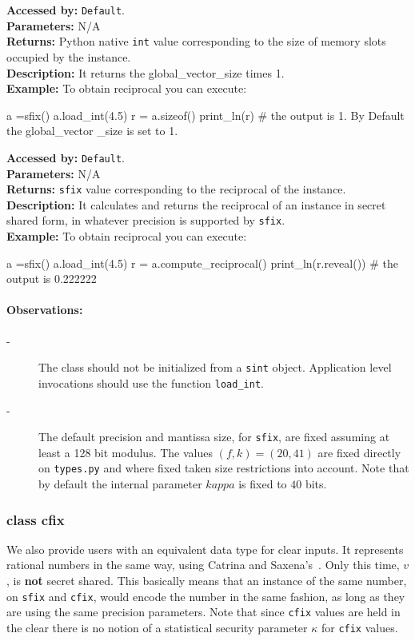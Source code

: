 		
			\textbf{Accessed by:} \verb|Default|.		 \\
			\textbf{Parameters:} N/A \\
			\textbf{Returns:}
				 Python native \verb|int| value corresponding to the size of memory slots occupied by the instance. \\
			\textbf{Description:}
				It returns the global_vector_size times 1. \\
	     	\textbf{Example:}
    		    To obtain reciprocal you can execute:
		     	\begin{mylisting}
				a =sfix()
				a.load_int(4.5)
				r = a.sizeof()
				print_ln(r)  # the output is 1. By Default the global_vector
				_size is set to 1.    	
     			\end{mylisting}	 
			\textbf{Accessed by:} \verb|Default|.		 \\
			\textbf{Parameters:} N/A \\
			\textbf{Returns:} \verb|sfix| value corresponding to the reciprocal of the instance. \\
			\textbf{Description:}
				It calculates and returns the reciprocal of an instance in secret shared form, 
				in whatever precision is supported by \verb|sfix|.\\
	     	\textbf{Example:}
    		    To obtain reciprocal you can execute:
		     	\begin{mylisting}
				a =sfix()
				a.load_int(4.5)
				r = a.compute_reciprocal()
				print_ln(r.reveal())  # the output is 0.222222   	
     			\end{mylisting}	 
	\paragraph{Observations:}
	\begin{description}
	\item[-] The class should not be initialized from a \verb|sint| object. 
    Application level invocations should use the function \verb|load_int|.
    \item[-] The default precision and mantissa size, for \verb|sfix|, are fixed assuming at least a 128 bit modulus. 
    The values $(f,k)=(20,41)$ are fixed directly on \verb|types.py| and where fixed taken size restrictions into account.
    Note that by default the internal parameter $kappa$ is fixed to $40$ bits. 
	\end{description}
	
\subsubsection{class cfix}
We also provide users with an equivalent data type for clear inputs. 
It represents rational numbers in the same way, using Catrina and Saxena's~\cite{CS10}.
Only this time, $v$, is \textbf{not} secret shared.  
This basically means that an instance of the same number, on \verb|sfix| and \verb|cfix|, 
would  encode the number in the same fashion, as long as they are using 
the same precision parameters.
Note that since \verb|cfix| values are held in the clear there is no notion
of a statistical security parameter $\kappa$ for \verb|cfix| values.

